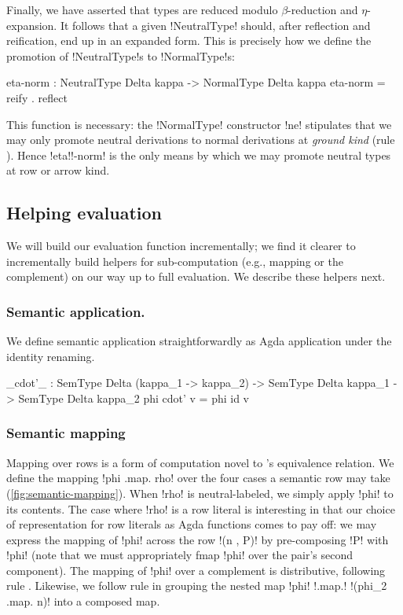 \documentclass[sigplan,10pt,review]{acmart}\settopmatter{printfolios=true,printccs=false,printacmref=false}
\begin{document}
Finally, we have asserted that types are reduced modulo $\beta$-reduction and $\eta$-expansion. It follows that a given !NeutralType! should, after reflection and reification, end up in an expanded form. This is precisely how we define the promotion of !NeutralType!s to !NormalType!s: 

\begin{agda}
eta-norm : NeutralType Delta kappa -> NormalType Delta kappa
eta-norm = reify . reflect
\end{agda}

This function is necessary: the !NormalType! constructor !ne! stipulates that we may only promote neutral derivations to normal derivations at \emph{ground kind} (rule ). Hence !eta!!-norm! is the only means by which we may promote neutral types at row or arrow kind.

\subsection{Helping evaluation}
We will build our evaluation function incrementally; we find it clearer to incrementally build helpers for sub-computation (e.g., mapping or the complement) on our way up to full evaluation. We describe these helpers next.

\subsubsection{Semantic application.}

We define semantic application straightforwardly as Agda application under the identity renaming.

\begin{agda}
_cdot'_ : SemType Delta (kappa_1 -> kappa_2) -> 
          SemType Delta kappa_1 -> 
          SemType Delta kappa_2
phi cdot' v = phi id v
\end{agda}

\subsubsection{Semantic mapping}
Mapping over rows is a form of computation novel to \Rome's equivalence relation. We define the mapping !phi .map. rho! over the four cases a semantic row may take (\cref{fig:semantic-mapping}). When !rho! is neutral-labeled, we simply apply !phi! to its contents. The case where !rho! is a row literal is interesting in that our choice of representation for row literals as Agda functions comes to pay off: we may express the mapping of !phi! across the row !(n , P)! by pre-composing !P! with !phi! (note that we must appropriately fmap !phi! over the pair's second component). The mapping of !phi! over a complement is distributive, following rule . Likewise, we follow rule  in grouping the nested map !phi! !.map.! !(phi_2 .map. n)! into a composed map. 
\end{document}
